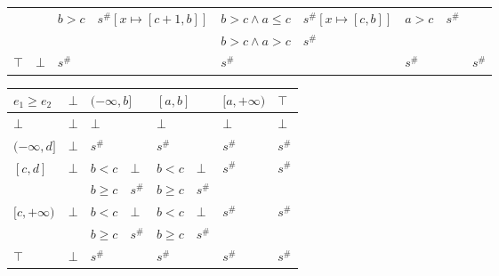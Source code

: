 \documentclass{article}
\begin{document}
\begin{table}[]
{\begin{tabular}{|l|l|ll|ll|ll|l|}
                                    &                         & \multirow{2}{*}{$b > c$} & \multirow{2}{*}{$s^\#[x \mapsto [c + 1, b]]$} & $b > c \land a \le c$ & $s^\#[x \mapsto [c, b]]$ & \multirow{2}{*}{$a > c$} & \multirow{2}{*}{$s^\#$}        &                                                 \\
                                    &                         &                          &                                               & $b > c \land a > c$   & $s^\#$                   &                          &                                &                                                 \\ \hline
    $\top$                          & $\bot$                  & \multicolumn{2}{l|}{$s^\#$}                                              & \multicolumn{2}{l|}{$s^\#$}                      & \multicolumn{2}{l|}{$s^\#$}                               & $s^\#$                                          \\ \hline
    \end{tabular}}
    \end{table}

    \begin{table}[]
        \begin{tabular}{|l|l|ll|ll|l|l|}
        \hline
        $e_1 \ge e_2$  & $\bot$ & \multicolumn{2}{l|}{$(-\infty, b]$} & \multicolumn{2}{l|}{$[a, b]$} & $[a, +\infty)$          & $\top$                  \\ \hline
        $\bot$         & $\bot$ & \multicolumn{2}{l|}{$\bot$}         & \multicolumn{2}{l|}{$\bot$}   & $\bot$                  & $\bot$                  \\ \hline
        $(-\infty, d]$ & $\bot$ & \multicolumn{2}{l|}{$s^\#$}         & \multicolumn{2}{l|}{$s^\#$}   & $s^\#$                  & $s^\#$                  \\ \hline
        $[c, d]$       & $\bot$ & $b < c$            & $\bot$         & $b < c$         & $\bot$      & \multirow{2}{*}{$s^\#$} & \multirow{2}{*}{$s^\#$} \\
                       &        & $b \ge c$          & $s^\#$         & $b \ge c$       & $s^\#$      &                         &                         \\ \hline
        $[c, +\infty)$ & $\bot$ & $b < c$            & $\bot$         & $b < c$         & $\bot$      & \multirow{2}{*}{$s^\#$} & \multirow{2}{*}{$s^\#$} \\
                       &        & $b \ge c$          & $s^\#$         & $b \ge c$       & $s^\#$      &                         &                         \\ \hline
        $\top$         & $\bot$ & \multicolumn{2}{l|}{$s^\#$}         & \multicolumn{2}{l|}{$s^\#$}   & $s^\#$                  & $s^\#$                  \\ \hline
        \end{tabular}
        \end{table}
\end{document}
